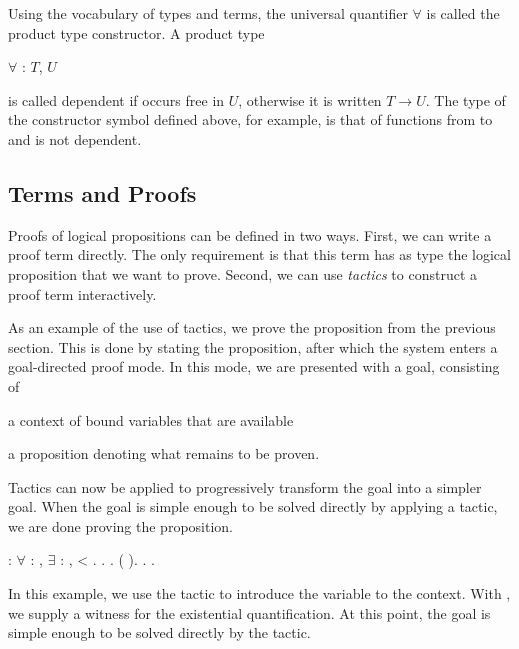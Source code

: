 Using the vocabulary of types and terms, the universal quantifier
$\forall$ is called the product type constructor. A product
type \begin{coqdoccode}$\forall$  : $T$,
  $U$\end{coqdoccode} is called dependent if  occurs free
in $U$, otherwise it is written $T \rightarrow U$. The type of the
constructor symbol  defined above, for example,
is that of functions from
to
and is not dependent.


\subsection{Terms and Proofs}

Proofs of logical propositions can be defined in two ways. First, we
can write a proof term directly. The only requirement is that this
term has as type the logical proposition that we want to
prove. Second, we can use \emph{tactics} to construct a proof term
interactively.

As an example of the use of tactics, we prove the proposition from the
previous section. This is done by stating the proposition, after which
the system enters a goal-directed proof mode. In this mode, we are
presented with a goal, consisting of
\begin{inparaenum}[(i)]
\item a context of bound variables that are available
\item a proposition denoting what remains to be proven.
\end{inparaenum}
Tactics can now be applied to progressively transform the goal into a
simpler goal. When the goal is simple enough to be solved directly by
applying a tactic, we are done proving the proposition.
\begin{singlespace}
\begin{coqdoccode}
\coqdocnoindent
{}
 :
\ensuremath{\forall}  :
,
\ensuremath{\exists}  :
,
 < .\coqdoceol
\coqdocnoindent
{}.\coqdoceol
\coqdocindent{1.0em}
 .\coqdoceol
\coqdocindent{1.0em}
(
).\coqdoceol
\coqdocindent{1.0em}
.\coqdoceol
\coqdocnoindent
{}.\coqdoceol
\end{coqdoccode}
\end{singlespace}
In this example, we use the tactic  to introduce the
variable  to the context. With ,
we supply a witness for the existential quantification. At this point,
the goal is simple enough to be solved directly by the
 tactic.

